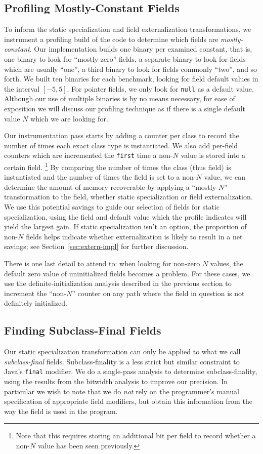 \documentclass[oribibl]{llncs}
\begin{document}
\subsection{Profiling Mostly-Constant Fields}
To inform the static specialization and field externalization
transformations, we instrument a profiling build of the code
to determine which fields are {\it mostly-constant}.  Our implementation
builds one binary per examined constant, that is, one binary to look
for ``mostly-zero'' fields, a separate binary to look for fields which
are usually ``one'', a third binary to look for fields commonly
``two'', and so forth.  We built ten binaries for each benchmark, looking for
field default values in the interval $[-5,5]$.
For pointer fields, we only look for {\tt null} as a default value.
Although our use of multiple binaries is by no means necessary,
for ease of exposition we will discuss our profiling technique
as if there is a single default value $N$ which we are looking for.

Our instrumentation pass starts by
adding a counter per class
to record the number of times each exact class type is instantiated.
We also add per-field counters which are incremented the {\tt first}
time a non-$N$ value is stored into a certain field.%
\footnote{Note that this requires storing an additional bit per field
  to record whether a non-$N$ value has been seen previously.}
By comparing the
number of times the class (thus field) is instantiated and the number
of times the field is set to a non-$N$ value, we can determine the
amount of memory recoverable by applying a ``mostly-$N$''
transformation to the field, whether static specialization or field
externalization.  We use this potential savings to guide our selection
of fields for static specialization, using the field and default value
which the profile indicates will yield the largest gain.  If static
specialization isn't an option, the
proportion of non-$N$ fields helps indicate whether externalization is
likely to result in a net savings; see Section~\ref{sec:extern-impl}
for further discussion.

There is one last detail to attend to:  when looking for non-zero $N$
values, the default zero value of
uninitialized fields becomes a problem.  For these cases, we use the
definite-initialization analysis described in the previous section to
increment the
``non-$N$'' counter on any path where the field in question is not
definitely initialized.

\subsection{Finding Subclass-Final Fields}
\label{sec:subclass-final}
Our static specialization transformation can only be applied to what
we call {\it subclass-final} fields.  Subclass-finality is a less strict
but similar constraint to Java's {\tt final} modifier.  We do a
single-pass analysis to determine subclass-finality, using the results
from the bitwidth analysis to improve our precision.  In particular we
wish to note that we do {\it not} rely on the programmer's manual
specification of appropriate field modifiers, but obtain this
information from the way the field is used in the program.
\end{document}
